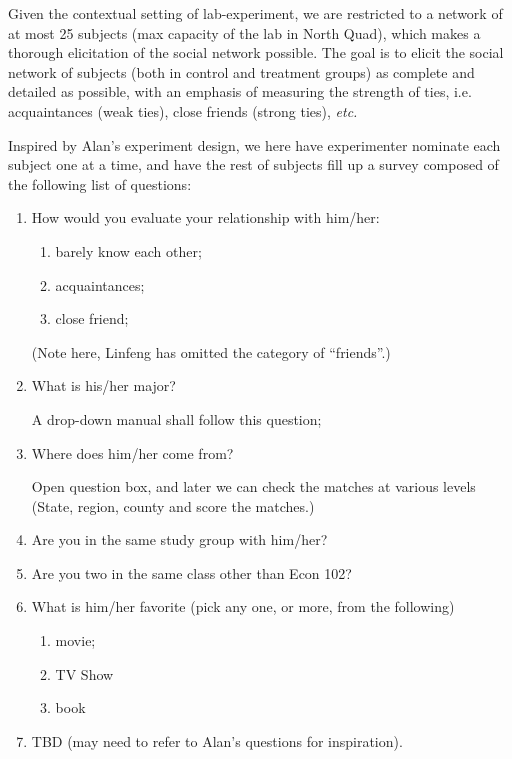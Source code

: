 
Given the contextual setting of lab-experiment, we are restricted to a network
of at most 25 subjects (max capacity of the lab in North Quad), which makes a
thorough elicitation of the social network possible. The goal is to elicit the
social network of subjects (both in control and treatment groups) as complete and
detailed as possible, with an emphasis of measuring the strength of ties, i.e.
acquaintances (weak ties), close friends (strong ties), \textit{etc.}

Inspired by Alan's experiment design, we here have experimenter nominate each
subject one at a time, and have the rest of subjects fill up a survey composed
of the following list of questions:
\begin{enumerate}
    \item How would you evaluate your relationship with him/her:
        \begin{enumerate}
            \item barely know each other;
            \item acquaintances;
            \item close friend;
        \end{enumerate}
        (Note here, Linfeng has omitted the category of ``friends''.)
    \item What is his/her major?

        A drop-down manual shall follow this question;
    \item Where does him/her come from?

        Open question box, and later we can check the matches at various levels
        (State, region, county and score the matches.)

    \item Are you in the same study group with him/her?

    \item Are you two in the same class other than Econ 102?

    \item What is him/her favorite (pick any one, or more, from the following)
        \begin{enumerate}
            \item movie;
            \item TV Show
            \item book
        \end{enumerate}

    \item TBD (may need to refer to Alan's questions for inspiration).
\end{enumerate}

